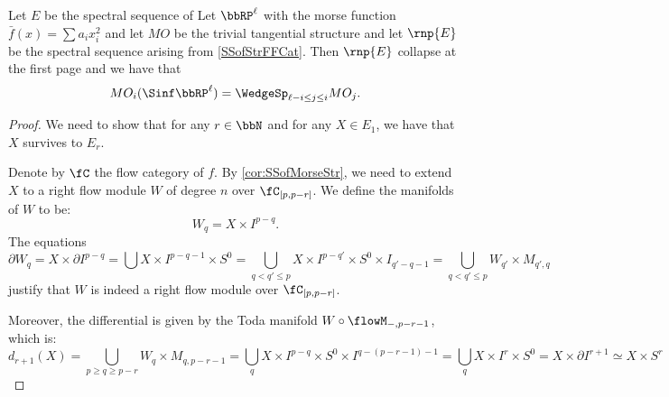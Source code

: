 \begin{prop}
    Let $E$ be the spectral sequence of
    Let $\bbRP^\ell$ with the morse function $\bar{f}(x)=\sum a_i x_i^2$ and let $MO$ be the trivial tangential structure and let  $\rnp{E}$ be the spectral sequence arising from \cref{SSofStrFFCat}. Then $\rnp{E}$ collapse at the first page and we have that 
    \begin{equation*}
        MO_i(\Sinf \bbRP^\ell) = \WedgeSp_{\ell-i \le j\le i} MO_j.
    \end{equation*}
\end{prop}
\begin{proof}
    We need to show that for any $r \in \bbN$ and for any $X \in E_1$, we have that $X$ survives to $E_r$.

    Denote by $\fC$ the flow category of $f$. By \cref{cor:SSofMorseStr}, we need to extend $X$ to a right flow module $W$ of degree $n$ over $\fC_{[p,p-r]}$. We define the manifolds of $W$ to be:
    \begin{equation*}
        W_q = X \times I^{p-q}.
    \end{equation*}
    The equations
    \begin{equation*}
        \partial W_q = X \times \partial I^{p-q} 
        = \bigcup X \times I^{p-q-1} \times S^0
        = \bigcup_{q < q' \leq p} X \times I^{p-q'} \times S^0 \times I_{q'-q-1}
        = \bigcup_{q < q' \leq p} W_{q'} \times M_{q', q}
    \end{equation*}
    justify that $W$ is indeed a right flow module over $\fC_{[p, p-r]}$.

    Moreover, the differential is given by the Toda manifold $W \circ \flowM_{-, p-r-1}$, which is:
    \begin{equation}\label{eq:unDiff}
        d_{r+1}(X) = \bigcup_{p \geq q \geq p-r} W_q \times M_{q, p-r-1} = \bigcup_q X \times I^{p-q} \times S^0 \times I^{q-(p-r-1)-1} = 
        \bigcup_q X \times I^r \times S^0 = X \times \partial I^{r+1} \simeq X \times S^r
    \end{equation}
\end{proof}

